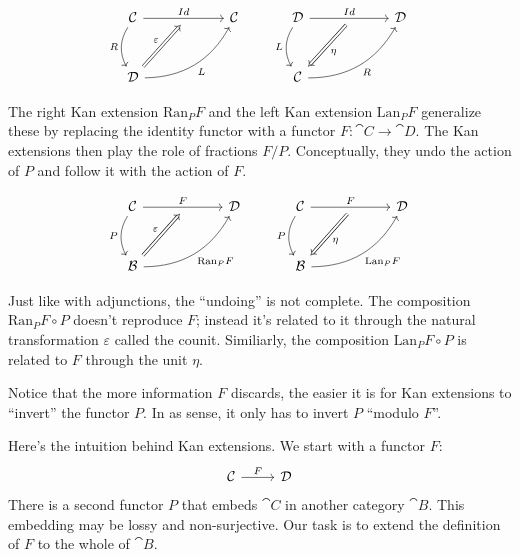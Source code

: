 \documentclass[DaoFP]{subfiles}
\begin{document}
\[
 \begin{tikzcd} [row sep=1cm, column sep=1cm]
 \cat C
 \arrow[rr, "Id", "" {name=ID, below} ]
 \arrow[d, bend right, "R"']
 && \cat C
 \\
 \cat D
  \arrow[urr, bend right, "L"']
 \arrow[Rightarrow, "\varepsilon",  to=ID]
 \end{tikzcd}
 \qquad
 \begin{tikzcd} [row sep=1cm, column sep=1cm]
 \cat D
 \arrow[rr, "Id", "" {name=ID, below} ]
 \arrow[d, bend right, "L"']
 && \cat D
 \\
 \cat C
  \arrow[urr, bend right, "R"']
 \arrow[Rightarrow, "\eta",  from=ID]
 \end{tikzcd}
\]

The right Kan extension $\text{Ran}_P F$ and the left Kan extension $\text{Lan}_P F$ generalize these by replacing the identity functor with a functor $F \colon \cat C \to \cat D$. The Kan extensions then play the role of fractions $F/P$. Conceptually, they undo the action of $P$ and follow it with the action of $F$.

\[
 \begin{tikzcd} [row sep=1cm, column sep=1cm]
 \cat C
 \arrow[rr, "F", "" {name=ID, below} ]
 \arrow[d, bend right, "P"']
 && \cat D
 \\
 \cat B
  \arrow[urr, bend right, "\text{Ran}_P F"']
 \arrow[Rightarrow, "\varepsilon",  to=ID]
 \end{tikzcd}
 \qquad
 \begin{tikzcd} [row sep=1cm, column sep=1cm]
 \cat C
 \arrow[rr, "F", "" {name=ID, below} ]
 \arrow[d, bend right, "P"']
 && \cat D
 \\
 \cat B
  \arrow[urr, bend right, "\text{Lan}_P F"']
 \arrow[Rightarrow, "\eta",  from=ID]
 \end{tikzcd}
\]

Just like with adjunctions, the ``undoing'' is not complete. The composition $\text{Ran}_P F \circ P$ doesn't reproduce $F$; instead it's related to it through the natural transformation $\varepsilon$ called the counit. Similiarly, the composition $\text{Lan}_P F \circ P$ is related to $F$ through the unit $\eta$.

Notice that the more information $F$ discards, the easier it is for Kan extensions to ``invert'' the functor $P$. In as sense, it only has to invert $P$ ``modulo $F$''.

Here's the intuition behind Kan extensions. We start with a functor $F$:
\[
 \begin{tikzcd} \cat C
 \arrow[r, "F"]
 & \cat D
  \end{tikzcd}
\]
There is a second functor $P$ that embeds $\cat C$ in another category $\cat B$. This embedding may be lossy and non-surjective. Our task is to extend the definition of $F$ to the whole of $\cat B$. 
\end{document}
